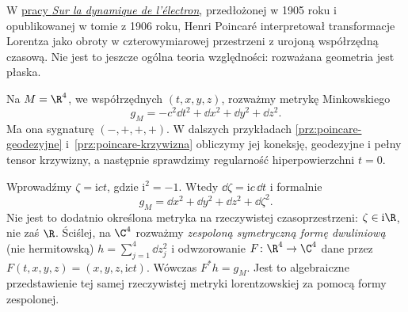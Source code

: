 \begin{przyklad}
\label{prz:poincare-czas-urojony}
W \href{https://fr.wikisource.org/wiki/Sur_la_dynamique_de_l\%E2\%80\%99\%C3\%A9lectron}
{pracy \emph{Sur la dynamique de l'électron}}, przedłożonej
w 1905 roku i opublikowanej w tomie z 1906 roku, Henri Poincaré
interpretował transformacje Lorentza jako obroty
w czterowymiarowej przestrzeni z urojoną współrzędną
czasową. Nie jest to jeszcze ogólna teoria względności:
rozważana geometria jest płaska.

Na $M=\R^4$, we współrzędnych $(t,x,y,z)$, rozważmy
metrykę Minkowskiego
\begin{equation}\label{eq:poincare-minkowski}
 g_M=-c^2\dd t^2+\dd x^2+\dd y^2+\dd z^2.
\end{equation}
Ma ona sygnaturę $(-,+,+,+)$. W dalszych przykładach
\ref{prz:poincare-geodezyjne} i~\ref{prz:poincare-krzywizna}
obliczymy jej koneksję, geodezyjne i pełny tensor
krzywizny, a następnie sprawdzimy regularność
hiperpowierzchni $t=0$.

Wprowadźmy $\zeta=\mathrm{i}ct$, gdzie $\mathrm{i}^2=-1$.
Wtedy $\dd\zeta=\mathrm{i}c\,\dd t$ i formalnie
\begin{equation}\label{eq:poincare-complex-metric}
 g_M=\dd x^2+\dd y^2+\dd z^2+\dd\zeta^2.
\end{equation}
Nie jest to dodatnio określona metryka na rzeczywistej
czasoprzestrzeni: $\zeta\in\mathrm{i}\R$, nie zaś
$\R$. Ściślej, na $\C^4$ rozważmy \emph{zespoloną
symetryczną formę dwuliniową} (nie hermitowską)
$h=\sum_{j=1}^4\dd z_j^2$ i odwzorowanie
$F\colon\R^4\to\C^4$ dane przez
$F(t,x,y,z)=(x,y,z,\mathrm{i}ct)$.
Wówczas $F^*h=g_M$. Jest to algebraiczne
przedstawienie tej samej rzeczywistej metryki
lorentzowskiej za pomocą formy zespolonej.


\end{przyklad}

